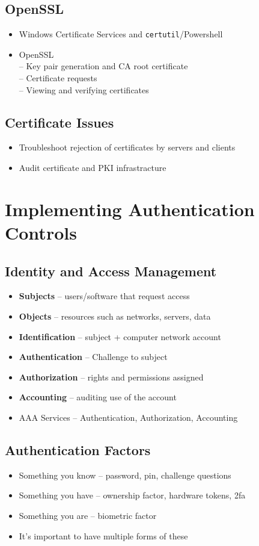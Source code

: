 	\subsection {OpenSSL}
		\begin{itemize}
			\item Windows Certificate Services and \texttt{certutil}/Powershell
			\item OpenSSL \\
				-- Key pair generation and CA root certificate \\
				-- Certificate requests \\
				-- Viewing and verifying certificates \\
		\end{itemize}
	\subsection{Certificate Issues}
		\begin{itemize}
			\item Troubleshoot rejection of certificates by servers and clients
			\item Audit certificate and PKI infrastracture
		\end{itemize}

\section {Implementing Authentication Controls}
	\subsection {Identity and Access Management}
		\begin{itemize}
			\item \textbf{Subjects} -- users/software that request access
			\item \textbf{Objects} -- resources such as networks, servers, data
			\item \textbf{Identification} -- subject + computer network account
			\item \textbf{Authentication} -- Challenge to subject
			\item \textbf{Authorization} -- rights and permissions assigned
			\item \textbf{Accounting} -- auditing use of the account
			\item AAA Services -- Authentication, Authorization, Accounting
		\end{itemize}
	\subsection {Authentication Factors}
		\begin{itemize}
			\item Something you know -- password, pin, challenge questions
			\item Something you have -- ownership factor, hardware tokens, 2fa
			\item Something you are -- biometric factor
			\item It's important to have multiple forms of these
		\end{itemize}
